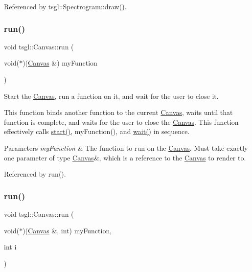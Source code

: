 Referenced by tsgl\+::\+Spectrogram\+::draw().

\mbox{\label{classtsgl_1_1_canvas_a5f3f00d6c380a662a239077456045502}} 
\subsubsection{\texorpdfstring{run()}{run()}\hspace{0.1cm}{\footnotesize\ttfamily [1/10]}}
{\footnotesize\ttfamily void tsgl\+::\+Canvas\+::run (\begin{DoxyParamCaption}\item[{void($\ast$)(\hyperlink{classtsgl_1_1_canvas}{Canvas} \&)}]{my\+Function }\end{DoxyParamCaption})\hspace{0.3cm}{\ttfamily [virtual]}}



Start the \hyperlink{classtsgl_1_1_canvas}{Canvas}, run a function on it, and wait for the user to close it. 

This function binds another function to the current \hyperlink{classtsgl_1_1_canvas}{Canvas}, waits until that function is complete, and waits for the user to close the \hyperlink{classtsgl_1_1_canvas}{Canvas}. This function effectively calls \hyperlink{classtsgl_1_1_canvas_a654315f9b08a9b3b072eebf4b4d8ae89}{start()}, {\ttfamily my\+Function}(), and \hyperlink{classtsgl_1_1_canvas_a39e69fd4d1ad8cf0e22ecea12f1ddf08}{wait()} in sequence. 
\begin{DoxyParams}{Parameters}
{\em my\+Function} & The function to run on the \hyperlink{classtsgl_1_1_canvas}{Canvas}. Must take exactly one parameter of type \hyperlink{classtsgl_1_1_canvas}{Canvas}\&, which is a reference to the \hyperlink{classtsgl_1_1_canvas}{Canvas} to render to. \\
\hline
\end{DoxyParams}


Referenced by run().

\mbox{\label{classtsgl_1_1_canvas_a62ec8be88bea1905cdb6855138ef3cb1}} 
\subsubsection{\texorpdfstring{run()}{run()}\hspace{0.1cm}{\footnotesize\ttfamily [2/10]}}
{\footnotesize\ttfamily void tsgl\+::\+Canvas\+::run (\begin{DoxyParamCaption}\item[{void($\ast$)(\hyperlink{classtsgl_1_1_canvas}{Canvas} \&, int)}]{my\+Function,  }\item[{int}]{i }\end{DoxyParamCaption})\hspace{0.3cm}{\ttfamily [virtual]}}



